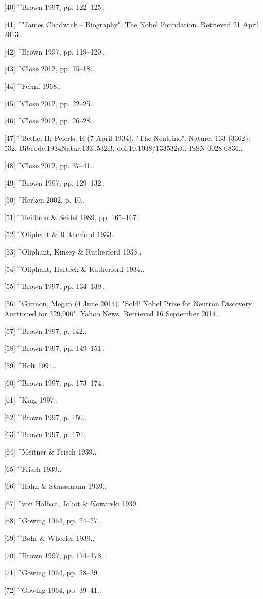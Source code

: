 [40]
^Brown 1997, pp. 122–125..

[41]
^"James Chadwick – Biography". The Nobel Foundation. Retrieved 21 April 2013..

[42]
^Brown 1997, pp. 119–120..

[43]
^Close 2012, pp. 15–18..

[44]
^Fermi 1968..

[45]
^Close 2012, pp. 22–25..

[46]
^Close 2012, pp. 26–28..

[47]
^Bethe, H; Peierls, R (7 April 1934). "The Neutrino". Nature. 133 (3362): 532. Bibcode:1934Natur.133..532B. doi:10.1038/133532a0. ISSN 0028-0836..

[48]
^Close 2012, pp. 37–41..

[49]
^Brown 1997, pp. 129–132..

[50]
^Herken 2002, p. 10..

[51]
^Heilbron & Seidel 1989, pp. 165–167..

[52]
^Oliphant & Rutherford 1933..

[53]
^Oliphant, Kinsey & Rutherford 1933..

[54]
^Oliphant, Harteck & Rutherford 1934..

[55]
^Brown 1997, pp. 134–139..

[56]
^Gannon, Megan (4 June 2014). "Sold! Nobel Prize for Neutron Discovery Auctioned for 329,000". Yahoo News. Retrieved 16 September 2014..

[57]
^Brown 1997, p. 142..

[58]
^Brown 1997, pp. 149–151..

[59]
^Holt 1994..

[60]
^Brown 1997, pp. 173–174..

[61]
^King 1997..

[62]
^Brown 1997, p. 150..

[63]
^Brown 1997, p. 170..

[64]
^Meitner & Frisch 1939..

[65]
^Frisch 1939..

[66]
^Hahn & Strassmann 1939..

[67]
^von Halban, Joliot & Kowarski 1939..

[68]
^Gowing 1964, pp. 24–27..

[69]
^Bohr & Wheeler 1939..

[70]
^Brown 1997, pp. 174–178..

[71]
^Gowing 1964, pp. 38–39..

[72]
^Gowing 1964, pp. 39–41..

